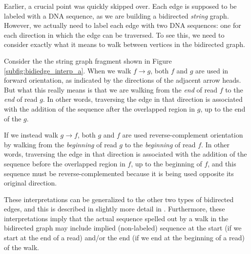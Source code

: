 \documentclass[12pt]{article}
\newcommand{\Subfigure}[1]{Figure \ref{#1}}
\begin{document}
Earlier, a crucial point was quickly skipped over.  Each edge is supposed to be
labeled with a DNA sequence, as we are building a bidirected {\em string} graph.
However, we actually need to label each edge with two DNA sequences: one for
each direction in which the edge can be traversed.  To see this, we need to
consider exactly what it means to walk between vertices in the bidirected graph.

Consider the the string graph fragment shown in
\Subfigure{subfig:bidiedge_interp_a}.  When we walk $f \to g$, both $f$ and $g$
are used in forward orientation, as indicated by the directions of the adjacent
arrow heads.  But what this really means is that we are walking from the {\em
end} of read $f$ to the {\em end} of read $g$.  In other words, traversing the
edge in that direction is associated with the addition of the sequence after the
overlapped region in $g$, up to the end of the $g$.

If we instead walk $g \to f$, both $g$ and $f$ are used reverse-complement
orientation by walking from the {\em beginning} of read $g$ to the {\em
beginning} of read $f$.  In other words, traversing the edge in that direction
is associated with the addition of the sequence before the overlapped region in
$f$, up to the beginning of $f$, and this sequence must be reverse-complemented
because it is being used opposite its original direction.

These interpretations can be generalized to the other two types of bidirected
edges, and this is described in slightly more detail in \cite{Myers2005}.
Furthermore, these interpretations imply that the actual sequence spelled out by
a walk in the bidirected graph may include implied (non-labeled) sequence at the
start (if we start at the end of a read) and/or the end (if we end at the
beginning of a read) of the walk.
\end{document}
